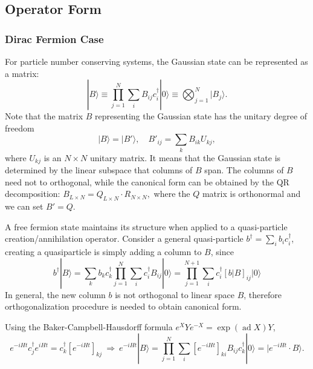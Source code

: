 \documentclass[aps,prx,superscriptaddress,nofootinbib]{revtex4}
\begin{document}
\subsection{Operator Form}


\subsubsection{Dirac Fermion Case}

For particle number conserving systems, the Gaussian state can be represented as a matrix: 
\begin{equation}
	|B\rangle \equiv \prod_{j=1}^N \sum_i B_{ij} c_{i}^\dagger |0\rangle 
	\equiv \bigotimes_{j=1}^N |B_j\rangle.
\end{equation}
Note that the matrix $B$ representing the Gaussian state has the unitary degree of freedom
$$|B\rangle = |B'\rangle, \quad B'_{ij} = \sum_k B_{ik}U_{kj},$$
where $U_{kj}$ is an $N\times N$ unitary matrix. It means that the Gaussian state is determined by the linear subspace that columns of $B$ span. The columns of $B$ need not to orthogonal, while the canonical form can be obtained by the QR decomposition: $B_{L\times N} = Q_{L\times N} \cdot R_{N\times N},$ where the $Q$ matrix is orthonormal and we can set $B' = Q$.

A free fermion state maintains its structure when applied to a quasi-particle creation/annihilation operator. Consider a general quasi-particle $b^\dagger = \sum_i b_i c_i^\dagger$, creating a quasiparticle is simply adding a column to $B$, since
\begin{equation}
	b^\dagger|B\rangle = \sum_k b_k c^\dagger_k \prod_{j=1}^N \sum_i c_i^\dagger B_{ij} |0\rangle
	= \prod_{j=1}^{N+1} \sum_i c_i^\dagger \left[b|B\right]_{ij} |0\rangle
\end{equation}
In general, the new column $b$ is not orthogonal to linear space $B$, therefore orthogonalization procedure is needed to obtain canonical form.

Using the Baker-Campbell-Hausdorff formula $e^X Y e^{-X} = \exp(\operatorname{ad} X) Y$, 
\begin{equation}
	e^{-iHt} c_j^\dagger e^{iHt} = c_k^\dagger[e^{-iHt}]_{kj}\ \Longrightarrow\ 
	e^{-iHt}|B\rangle = \prod_{j=1}^N \sum_i [e^{-iHt}]_{ki} B_{ij} c_{k}^\dagger |0\rangle
	= |e^{-iHt}\cdot B\rangle.
\end{equation}
\end{document}
